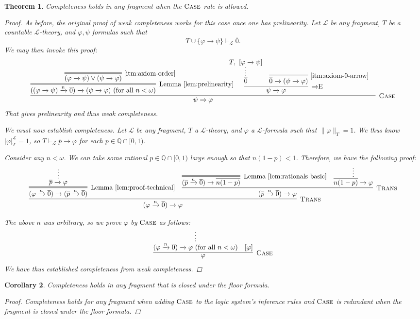 \documentclass{amsart}
\newtheorem{theorem}{Theorem}[section]
\newtheorem{corollary}[theorem]{Corollary}
\theoremstyle{definition}
\numberwithin{equation}{theorem}
\renewcommand{\phi}{\varphi}
\newcommand{\Q}{\mathbb{Q}}
\newcommand{\proves}{\vdash}
\newcommand{\rat}[1]{{\overline{#1}}}
\newcommand{\narrow}[1]{\xrightarrow{#1}}
\renewcommand{\to}{\narrow{}}
\newcommand{\arr}{{\to}}
\newcommand{\elim}{\!\operatorname{E}}
\newcommand{\trans}{\text{\sc{Trans}}}
\newcommand{\aref}[1]{\!\text{\ref{itm:axiom-#1}}}
\newcommand{\frag}{\mathcal{L}}
\begin{document}
\begin{theorem}\label{thm:completeness-in-fragments}
  Completeness holds in any fragment when the $\text{\sc{Case}}$ rule is allowed.
  \begin{proof}
    As before, the original proof of weak completeness works for this case once one has prelinearity.
    Let $\frag$ be any fragment, $T$ be a countable $\frag$-theory, and $\phi,\psi$ formulas such that 
    \[
      T\cup\{\phi\to\psi\}\proves_\frag\rat 0.
    \]
    We may then invoke this proof:
    \[
      \infer[\caserule]{\psi\to\phi}{
        \infer=[\text{Lemma~\ref{lem:prelinearity}}]{((\phi\to\psi)\narrow{n}\rat 0)\to(\psi\to\phi)\text{ (for all $n<\omega$)}}{
          \infer=[\aref{order}]{(\phi\to\psi)\vee(\psi\to\phi)}{}
        } &
        \!\!\!\!\!\!\!\!\!\!
        \infer[\arr\elim]{\psi\to\phi}{
          \infer*{\rat 0}{T,\ [\phi\to\psi]} &
          \infer=[\aref{0-arrow}]{\rat 0\to(\psi\to\phi)}{}
        } &
      }
    \]
    That gives prelinearity and thus weak completeness.
    
    We must now establish completeness.
    Let $\frag$ be any fragment, $T$ a $\frag$-theory, and $\phi$ a $\frag$-formula such that $\|\phi\|_T=1$.
    We thus know $|\phi|_T^\frag=1$, so $T\proves_\frag\rat p\to\phi$ for each $p\in\Q\cap[0,1)$.
    
    Consider any $n<\omega$.
    We can take some rational $p\in\Q\cap[0,1)$ large enough so that $n(1-p)<1$.
    Therefore, we have the following proof:
    \[
      \infer[\trans]{(\phi\narrow{n}\rat 0)\to\phi}{
        \infer=[\text{Lemma~\ref{lem:proof-technical}}]{(\phi\narrow{n}\rat 0)\to(\rat p\narrow n\rat 0)}{
          \infer*{\rat p\to\phi}{}
        } &
        \infer[\trans]{(\rat p\narrow n\rat 0)\to\phi}{
          \infer=[\text{Lemma~\ref{lem:rationals-basic}}]{(\rat p\narrow n\rat 0)\to\rat{n(1-p)}}{} &
          \infer*{\rat{n(1-p)}\to\phi}{}
        }
      }
    \]
    
    The above $n$ was arbitrary, so we prove $\phi$ by $\text{\sc{Case}}$ as follows:
    \[
      \infer[\caserule]{\phi}{
        \infer*{(\phi\narrow n\rat 0)\to\phi\text{ (for all $n<\omega$)}}{} &
        [\phi]
      }
    \]
    We have thus established completeness from weak completeness.
  \end{proof}
\end{theorem}
\begin{corollary}\label{cor:floor-completeness}
  Completeness holds in any fragment that is closed under the floor formula.
  \begin{proof}
    Completeness holds for any fragment when adding $\text{\sc{Case}}$ to the logic system's inference rules and $\text{\sc{Case}}$ is redundant when the fragment is closed under the floor formula.
  \end{proof}
\end{corollary}
\end{document}
